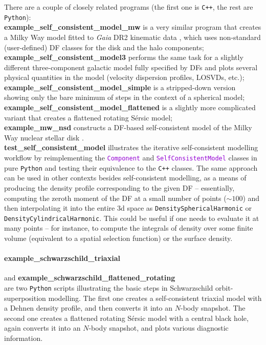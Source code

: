 \documentclass[12pt]{article}
\newcommand{\Cpp}  {\texttt{C++}\xspace}
\newcommand{\Python}{\texttt{Python}\xspace}
\newcommand{\ttt}[1]{\textcolor{darkviolet}{\texttt{#1}}}
\newcommand{\ppp}[1]{\textcolor{darkolive} {\texttt{#1}}}
\begin{document}
There are a couple of closely related programs (the first one is \Cpp, the rest are \Python):\\
\textbf{example_self_consistent_model_mw} is a very similar program that creates a Milky Way model fitted to \textit{Gaia} DR2 kinematic data \cite{BinneyVasiliev2023}, which uses non-standard (user-defined) DF classes for the disk and the halo components;\\
\textbf{example_self_consistent_model3} performs the same task for a slightly different three-component galactic model fully specified by DFs and plots several physical quantities in the model (velocity dispersion profiles, LOSVDs, etc.);\\
\textbf{example_self_consistent_model_simple} is a stripped-down version showing only the bare minimum of steps in the context of a spherical model;\\
\textbf{example_self_consistent_model_flattened} is a slightly more complicated variant that creates a flattened rotating S\'ersic model;\\
\textbf{example_mw_nsd} constructs a DF-based self-consistent model of the Milky Way nuclear stellar disk \cite{Sormani2022}.\\
\textbf{test_self_consistent_model} illustrates the iterative self-consistent modelling workflow by reimplementing the \ttt{Component} and \ttt{SelfConsistentModel} classes in pure \Python and testing their equivalence to the \Cpp classes. The same approach can be used in other contexts besides self-consistent modelling, as a means of producing the density profile corresponding to the given DF -- essentially, computing the zeroth moment of the DF at a small number of points ($\sim 100$) and then interpolating it into the entire 3d space as \ppp{DensitySphericalHarmonic} or \ppp{DensityCylindricalHarmonic}. This could be useful if one needs to evaluate it at many points -- for instance, to compute the integrals of density over some finite volume (equivalent to a spatial selection function) or the surface density.

\paragraph{example_schwarzschild_triaxial} and \;\;\textbf{example_schwarzschild_flattened_rotating}\;\;\\ are two \Python scripts illustrating the basic steps in Schwarzschild orbit-superposition  modelling. The first one creates a self-consistent triaxial model with a Dehnen density profile, and then converts it into an $N$-body snapshot. The second one creates a flattened rotating S\'ersic model with a central black hole, again converts it into an $N$-body snapshot, and plots various diagnostic information.
\end{document}
